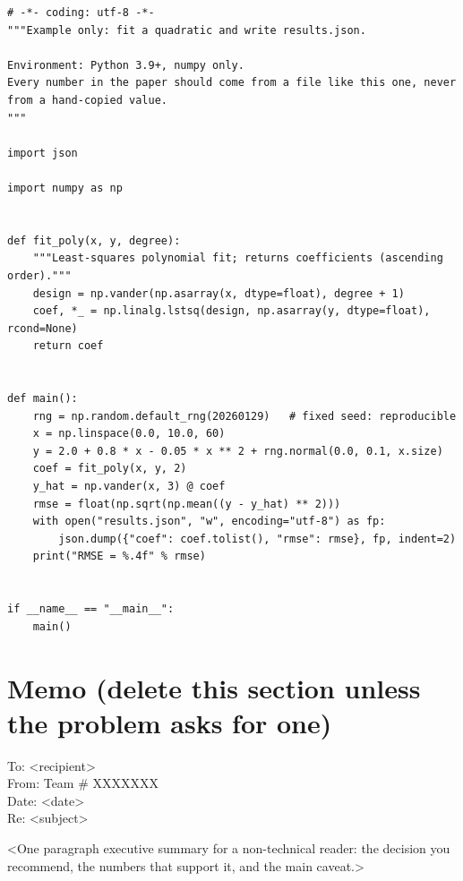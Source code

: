 \documentclass[12pt]{article}
\newcommand{\teamcontrol}{XXXXXXX}   %
\begin{document}
\begin{lstlisting}[caption={Example program: least-squares fit with reproducible output}, label={lst:example}]
# -*- coding: utf-8 -*-
"""Example only: fit a quadratic and write results.json.

Environment: Python 3.9+, numpy only.
Every number in the paper should come from a file like this one, never
from a hand-copied value.
"""

import json

import numpy as np


def fit_poly(x, y, degree):
    """Least-squares polynomial fit; returns coefficients (ascending order)."""
    design = np.vander(np.asarray(x, dtype=float), degree + 1)
    coef, *_ = np.linalg.lstsq(design, np.asarray(y, dtype=float), rcond=None)
    return coef


def main():
    rng = np.random.default_rng(20260129)   # fixed seed: reproducible
    x = np.linspace(0.0, 10.0, 60)
    y = 2.0 + 0.8 * x - 0.05 * x ** 2 + rng.normal(0.0, 0.1, x.size)
    coef = fit_poly(x, y, 2)
    y_hat = np.vander(x, 3) @ coef
    rmse = float(np.sqrt(np.mean((y - y_hat) ** 2)))
    with open("results.json", "w", encoding="utf-8") as fp:
        json.dump({"coef": coef.tolist(), "rmse": rmse}, fp, indent=2)
    print("RMSE = %.4f" % rmse)


if __name__ == "__main__":
    main()
\end{lstlisting}

\section*{Memo (delete this section unless the problem asks for one)}
\begin{flushleft}
To: <recipient>\\
From: Team \# \teamcontrol\\
Date: <date>\\
Re: <subject>
\end{flushleft}

<One paragraph executive summary for a non-technical reader: the decision you
recommend, the numbers that support it, and the main caveat.>
\end{document}
